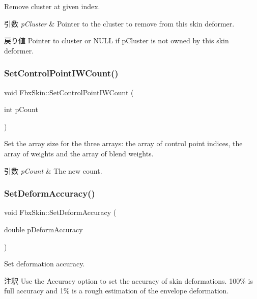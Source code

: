 Remove cluster at given index. 
\begin{DoxyParams}{引数}
{\em p\+Cluster} & Pointer to the cluster to remove from this skin deformer. \\
\hline
\end{DoxyParams}
\begin{DoxyReturn}{戻り値}
Pointer to cluster or {\ttfamily N\+U\+LL} if p\+Cluster is not owned by this skin deformer. 
\end{DoxyReturn}
\mbox{\label{class_fbx_skin_a7748f1c118ec62548777324a505f6d5d}} 
\subsubsection{\texorpdfstring{Set\+Control\+Point\+I\+W\+Count()}{SetControlPointIWCount()}}
{\footnotesize\ttfamily void Fbx\+Skin\+::\+Set\+Control\+Point\+I\+W\+Count (\begin{DoxyParamCaption}\item[{int}]{p\+Count }\end{DoxyParamCaption})}

Set the array size for the three arrays\+: the array of control point indices, the array of weights and the array of blend weights. 
\begin{DoxyParams}{引数}
{\em p\+Count} & The new count. \\
\hline
\end{DoxyParams}
\mbox{\label{class_fbx_skin_a3b74e10c3fb5a8d3a20feab6555fecdf}} 
\subsubsection{\texorpdfstring{Set\+Deform\+Accuracy()}{SetDeformAccuracy()}}
{\footnotesize\ttfamily void Fbx\+Skin\+::\+Set\+Deform\+Accuracy (\begin{DoxyParamCaption}\item[{double}]{p\+Deform\+Accuracy }\end{DoxyParamCaption})}

Set deformation accuracy. \begin{DoxyRemark}{注釈}
Use the Accuracy option to set the accuracy of skin deformations. 100\% is full accuracy and 1\% is a rough estimation of the envelope deformation. 
\end{DoxyRemark}

